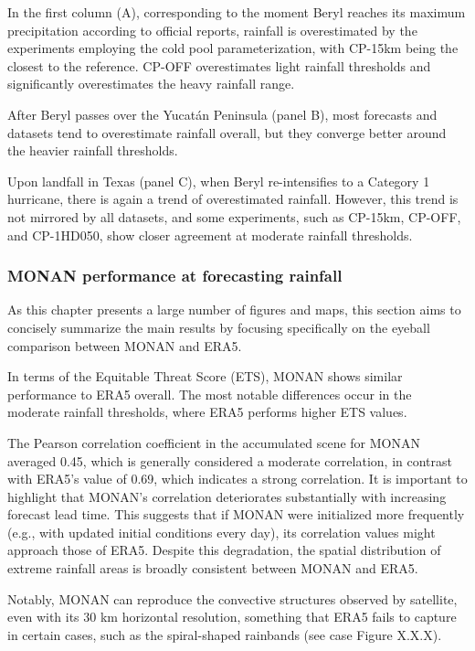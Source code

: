 In the first column (A), corresponding to the moment Beryl reaches its maximum precipitation according to official reports, rainfall is overestimated by the experiments employing the cold pool parameterization, with CP-15km being the closest to the reference. CP-OFF overestimates light rainfall thresholds and significantly overestimates the heavy rainfall range.

After Beryl passes over the Yucatán Peninsula (panel B), most forecasts and datasets tend to overestimate rainfall overall, but they converge better around the heavier rainfall thresholds.

Upon landfall in Texas (panel C), when Beryl re-intensifies to a Category 1 hurricane, there is again a trend of overestimated rainfall. However, this trend is not mirrored by all datasets, and some experiments, such as CP-15km, CP-OFF, and CP-1HD050, show closer agreement at moderate rainfall thresholds.

\subsubsection{MONAN performance at forecasting rainfall}

As this chapter presents a large number of figures and maps, this section aims to concisely summarize the main results by focusing specifically on the eyeball comparison between MONAN and ERA5.

In terms of the Equitable Threat Score (ETS), MONAN shows similar performance to ERA5 overall. The most notable differences occur in the moderate rainfall thresholds, where ERA5 performs higher ETS values.

The Pearson correlation coefficient in the accumulated scene for MONAN averaged 0.45, which is generally considered a moderate correlation, in contrast with ERA5's value of 0.69, which indicates a strong correlation. It is important to highlight that MONAN's correlation deteriorates substantially with increasing forecast lead time. This suggests that if MONAN were initialized more frequently (e.g., with updated initial conditions every day), its correlation values might approach those of ERA5. Despite this degradation, the spatial distribution of extreme rainfall areas is broadly consistent between MONAN and ERA5.

Notably, MONAN can reproduce the convective structures observed by satellite, even with its 30 km horizontal resolution, something that ERA5 fails to capture in certain cases, such as the spiral-shaped rainbands (see case Figure X.X.X).

